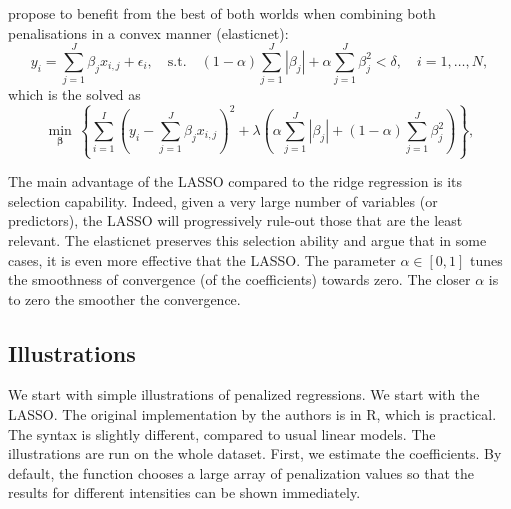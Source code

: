 \documentclass[]{krantz}
\makeatletter
\newenvironment{Shaded}{\begin{snugshade}}{\end{snugshade}}
\newcommand{\CommentTok}[1]{\textcolor[rgb]{0.37,0.37,0.37}{\textit{#1}}}
\newcommand{\DataTypeTok}[1]{\textcolor[rgb]{0.27,0.27,0.27}{#1}}
\newcommand{\DecValTok}[1]{\textcolor[rgb]{0.06,0.06,0.06}{#1}}
\newcommand{\KeywordTok}[1]{\textcolor[rgb]{0.27,0.27,0.27}{\textbf{#1}}}
\newcommand{\NormalTok}[1]{#1}
\newcommand{\OperatorTok}[1]{\textcolor[rgb]{0.43,0.43,0.43}{\textbf{#1}}}
\newcommand{\StringTok}[1]{\textcolor[rgb]{0.5,0.5,0.5}{#1}}
\newenvironment{kframe}{%
\medskip{}
\setlength{\fboxsep}{.8em}
 \def\at@end@of@kframe{}%
 \ifinner\ifhmode%
  \def\at@end@of@kframe{\end{minipage}}%
  \begin{minipage}{\columnwidth}%
 \fi\fi%
 \def\FrameCommand##1{\hskip\@totalleftmargin \hskip-\fboxsep
 \colorbox{shadecolor}{##1}\hskip-\fboxsep
     \hskip-\linewidth \hskip-\@totalleftmargin \hskip\columnwidth}%
 \MakeFramed {\advance\hsize-\width
   \@totalleftmargin\z@ \linewidth\hsize
   \@setminipage}}%
 {\par\unskip\endMakeFramed%
 \at@end@of@kframe}
\renewenvironment{Shaded}{\begin{kframe}}{\end{kframe}}
\theoremstyle{definition}
\theoremstyle{definition}
\theoremstyle{definition}
\theoremstyle{remark}
\makeatother
\begin{document}
\citet{zou2005regularization} propose to benefit from the best of both
worlds when combining both penalisations in a convex manner
(elasticnet): \begin{equation}
\label{eq:elasticnet}
y_i = \sum_{j=1}^J \beta_jx_{i,j} + \epsilon_i, \quad \text{s.t.} \quad (1-\alpha)\sum_{j=1}^J |\beta_j| +\alpha\sum_{j=1}^J \beta_j^2< \delta, \quad i =1,\dots,N,
\end{equation} which is the solved as \begin{equation}
\label{eq:elastic}
\underset{\mathbf{\beta}}{\min} \, \left\{ \sum_{i=1}^I\left(y_i - \sum_{j=1}^J\beta_jx_{i,j} \right)^2+\lambda \left(\alpha\sum_{j=1}^J |\beta_j|+ (1-\alpha)\sum_{j=1}^J \beta_j^2\right) \right\},
\end{equation}

The main advantage of the LASSO compared to the ridge regression is its
selection capability. Indeed, given a very large number of variables (or
predictors), the LASSO will progressively rule-out those that are the
least relevant. The elasticnet preserves this selection ability and
\citet{zou2005regularization} argue that in some cases, it is even more
effective that the LASSO. The parameter \(\alpha \in [0,1]\) tunes the
smoothness of convergence (of the coefficients) towards zero. The closer
\(\alpha\) is to zero the smoother the convergence.

\hypertarget{illustrations}{%
\subsection{Illustrations}\label{illustrations}}

We start with simple illustrations of penalized regressions. We start
with the LASSO. The original implementation by the authors is in R,
which is practical. The syntax is slightly different, compared to usual
linear models. The illustrations are run on the whole dataset. First, we
estimate the coefficients. By default, the function chooses a large
array of penalization values so that the results for different
intensities can be shown immediately.

\footnotesize

\begin{Shaded}
\end{Shaded}
\end{document}
